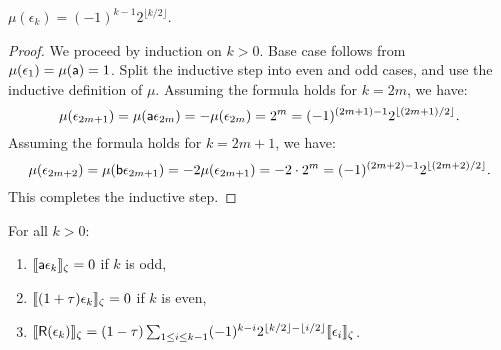 \begin{lem}
        $\mu(\epsilon_k) = (-1)^{k-1} 2^{\lfloor k/2\rfloor}$.
\end{lem}
\begin{proof} We proceed by induction on $k>0$. Base case follows from
$\mu(\epsilon_1)=\mu(\mathsf{a})=1$. Split the inductive step into even and odd cases,
and use the inductive definition of $\mu$.
Assuming the formula holds for $k=2m$, we have:
\[
  \mu(\epsilon_{2m+1}) = \mu(\mathsf{a}\epsilon_{2m}) 
              = -\mu(\epsilon_{2m}) 
              = 2^m 
              = (-1)^{(2m+1)-1} 2^{\lfloor(2m+1)/2\rfloor}.
      \] 
Assuming the formula holds for $k=2m+1$, we have:
\[
  \mu(\epsilon_{2m+2}) = \mu(\mathsf{b}\epsilon_{2m+1}) 
              = -2\mu(\epsilon_{2m+1})
              = -2 \cdot 2^m 
              = (-1)^{(2m+2)-1} 2^{\lfloor(2m+2)/2\rfloor}.
\] 
This completes the inductive step. 
\end{proof}
\begin{prop}\label{prop:fundamental}For all $k>0$:
\begin{enumerate}
        \item $\llbracket{\mathsf{a}\epsilon_k}\rrbracket_\zeta = 0$ if $k$ is odd,
        \item $\llbracket{(1+\tau)\epsilon_k}\rrbracket_\zeta = 0$ if $k$ is even,
        \item $\llbracket{\mathsf{R}(\epsilon_k)}\rrbracket_\zeta = (1-\tau) \sum_{1 \le i \le k-1} (-1)^{k-i} 2^{\lfloor k/2\rfloor - \lfloor i/2\rfloor} \llbracket{\epsilon_i}\rrbracket_\zeta$.
\end{enumerate}
\end{prop}
